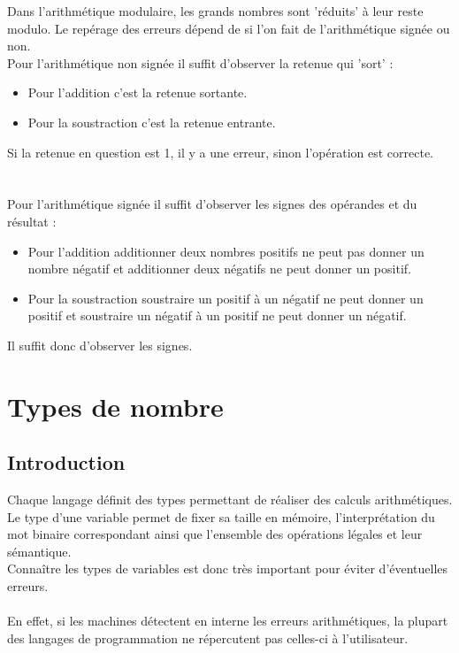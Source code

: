 \documentclass[a4paper,10pt]{book}
\begin{document}
Dans l'arithmétique modulaire, les grands nombres sont 'réduits' à leur reste modulo. Le repérage des erreurs dépend de si l’on fait de l’arithmétique signée ou non.\\

Pour l’arithmétique non signée il suffit d’observer la retenue qui 'sort' :\\
\begin{itemize} \item Pour l’addition c’est la retenue sortante.
\item Pour la soustraction c’est la retenue entrante.\\ \end{itemize}
Si la retenue en question est 1, il y a une erreur, sinon l’opération est correcte.\\\\\\

Pour l’arithmétique signée il suffit d’observer les signes des opérandes et du résultat :\\
\begin{itemize} \item Pour l’addition additionner deux nombres positifs ne peut pas donner un nombre négatif et additionner deux négatifs ne peut donner un positif.
\item Pour la soustraction soustraire un positif à un négatif ne peut donner un positif et soustraire un négatif à un positif ne peut donner un négatif.\\ \end{itemize}
Il suffit donc d’observer les signes.

\section{Types de nombre}
\subsection{Introduction}
Chaque langage définit des types permettant de réaliser des calculs arithmétiques.\\

Le type d’une variable permet de fixer sa taille en mémoire, l’interprétation du mot binaire correspondant ainsi que l’ensemble des opérations légales et leur sémantique.\\

Connaître les types de variables est donc très important pour éviter d'éventuelles erreurs.\\\\
En effet, si les machines détectent en interne les erreurs arithmétiques, la plupart des langages de programmation ne répercutent pas celles-ci à l’utilisateur.
\end{document}
